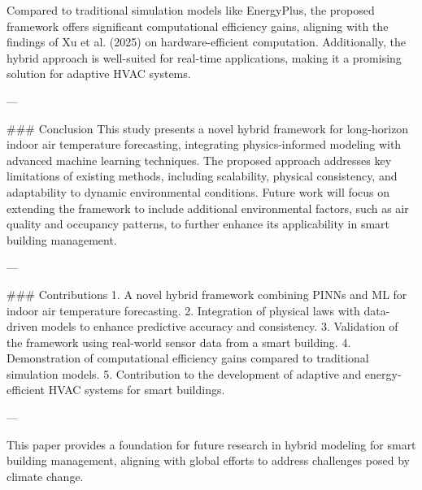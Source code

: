 Compared to traditional simulation models like EnergyPlus, the proposed framework offers significant computational efficiency gains, aligning with the findings of Xu et al. (2025) on hardware-efficient computation. Additionally, the hybrid approach is well-suited for real-time applications, making it a promising solution for adaptive HVAC systems.

---

### Conclusion  
This study presents a novel hybrid framework for long-horizon indoor air temperature forecasting, integrating physics-informed modeling with advanced machine learning techniques. The proposed approach addresses key limitations of existing methods, including scalability, physical consistency, and adaptability to dynamic environmental conditions. Future work will focus on extending the framework to include additional environmental factors, such as air quality and occupancy patterns, to further enhance its applicability in smart building management.

---

### Contributions  
1. A novel hybrid framework combining PINNs and ML for indoor air temperature forecasting.  
2. Integration of physical laws with data-driven models to enhance predictive accuracy and consistency.  
3. Validation of the framework using real-world sensor data from a smart building.  
4. Demonstration of computational efficiency gains compared to traditional simulation models.  
5. Contribution to the development of adaptive and energy-efficient HVAC systems for smart buildings.  

--- 

This paper provides a foundation for future research in hybrid modeling for smart building management, aligning with global efforts to address challenges posed by climate change.